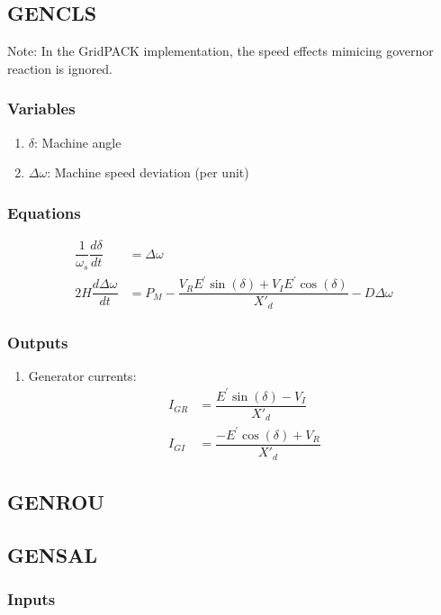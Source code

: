 \documentclass[12pt]{article}
\newcommand{\dw}{\Delta\omega}
\newcommand{\Xdp}{X{'}_d}
\newcommand{\Ep}{E^{'}}
\begin{document}
\subsection{GENCLS\cite{GENCLS}}
Note: In the GridPACK implementation, the speed effects mimicing governor reaction is ignored.

\subsubsection{Variables}
\begin{enumerate}
  \item $\delta$: Machine angle
  \item $\dw$: Machine speed deviation (per unit)
\end{enumerate}

\subsubsection{Equations}
\begin{align}
\dfrac{1}{\omega_s}\dfrac{d\delta}{dt} &= \dw \\
2H\dfrac{d\dw}{dt} &= P_M - \dfrac{V_R\Ep\sin(\delta) + V_I\Ep\cos(\delta)}{\Xdp} - D\dw
\end{align}

\subsubsection{Outputs}
\begin{enumerate}
	\item Generator currents:
\begin{align}
  I_{GR} &= \dfrac{\Ep\sin(\delta) - V_I}{\Xdp} \\
  I_{GI} &= \dfrac{-\Ep\cos(\delta) + V_R}{\Xdp}
\end{align}
\end{enumerate}

\subsection{GENROU}

\subsection{GENSAL}

\subsubsection{Inputs}
\end{document}
